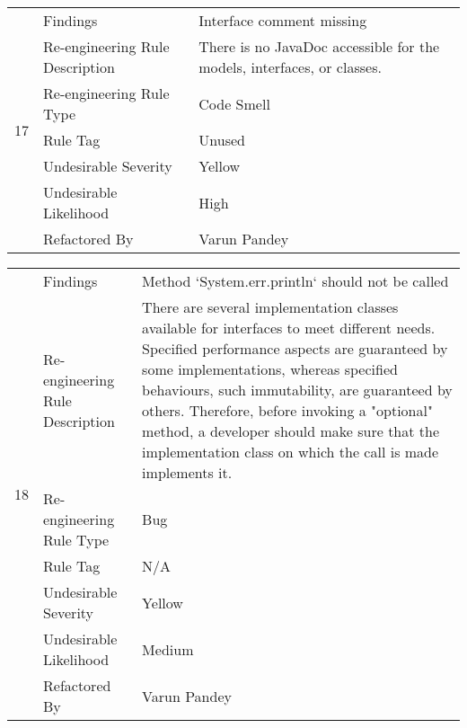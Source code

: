 \documentclass[12pt,english]{article}
\begin{document}
\begin{table}[!ht]
    \begin{tabularx}{\textwidth}{|c|l|X|}
    \hline
        \multirow{7}{*}{17} & Findings & Interface comment missing \\ \cline{2-3}
        & Re-engineering Rule Description & There is no JavaDoc accessible for the models, interfaces, or classes.
  \\ \cline{2-3}
        & Re-engineering Rule Type & Code Smell \\ \cline{2-3}
        & Rule Tag & Unused \\ \cline{2-3}
        & Undesirable Severity & Yellow \\ \cline{2-3}
        & Undesirable Likelihood & High \\ \cline{2-3}
        & Refactored By & Varun Pandey \\ \hline
    \end{tabularx}
\end{table}

\begin{table}[!ht]
    \begin{tabularx}{\textwidth}{|c|l|X|}
    \hline
        \multirow{7}{*}{18} & Findings & Method ‘System.err.println‘ should not be called \\ \cline{2-3}
        & Re-engineering Rule Description & There are several implementation classes available for interfaces to meet different needs. Specified performance aspects are guaranteed by some implementations, whereas specified behaviours, such immutability, are guaranteed by others.
        Therefore, before invoking a "optional" method, a developer should make sure that the implementation class on which the call is made implements it.
 \\ \cline{2-3}
        & Re-engineering Rule Type & Bug \\ \cline{2-3}
        & Rule Tag & N/A \\ \cline{2-3}
        & Undesirable Severity & Yellow \\ \cline{2-3}
        & Undesirable Likelihood & Medium \\ \cline{2-3}
        & Refactored By & Varun Pandey \\ \hline
    \end{tabularx}
\end{table}
\end{document}
